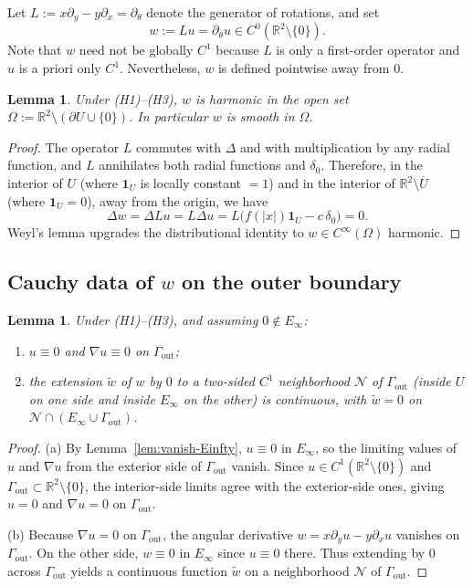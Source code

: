 \documentclass[11pt]{article}
\newtheorem{lemma}[theorem]{Lemma}
\newcommand{\R}{\mathbb R}
\newcommand{\1}{\mathbf 1}
\begin{document}
Let $L:=x\partial_y-y\partial_x=\partial_\theta$ denote the generator of rotations, and set
\[
w:=Lu=\partial_\theta u\in C^0(\R^2\setminus\{0\}).
\]
Note that $w$ need not be globally $C^1$ because $L$ is only a first-order operator and $u$
is a priori only $C^1$. Nevertheless, $w$ is defined pointwise away from $0$.

\begin{lemma}\label{lem:w-harmonic}
Under (H1)--(H3), $w$ is harmonic in the open set
$\Omega:=\R^2\setminus(\partial U\cup\{0\})$.
In particular $w$ is smooth in $\Omega$.
\end{lemma}

\begin{proof}
The operator $L$ commutes with $\Delta$ and with multiplication by any radial function, and
$L$ annihilates both radial functions and $\delta_0$. Therefore, in the interior of $U$
(where $\1_U$ is locally constant $=1$) and in the interior of $\R^2\setminus\overline U$
(where $\1_U=0$), away from the origin, we have
\[
\Delta w=\Delta Lu=L\Delta u=L\bigl(f(|x|)\1_U-c\,\delta_0\bigr)=0.
\]
Weyl's lemma upgrades the distributional identity to $w\in C^\infty(\Omega)$ harmonic.
\end{proof}

\subsection{Cauchy data of $w$ on the outer boundary}

\begin{lemma}\label{lem:cauchy-data}
Under (H1)--(H3), and assuming $0\notin E_\infty$:
\begin{enumerate}[label=(\alph*)]
\item $u\equiv 0$ and $\nabla u\equiv 0$ on $\Gamma_{\mathrm{out}}$;
\item the extension $\tilde w$ of $w$ by $0$ to a two-sided $C^1$ neighborhood
$\mathcal N$ of $\Gamma_{\mathrm{out}}$ (inside $U$ on one side and inside $E_\infty$ on the
other) is continuous, with $\tilde w=0$ on $\mathcal N\cap(E_\infty\cup\Gamma_{\mathrm{out}})$.
\end{enumerate}
\end{lemma}

\begin{proof}
(a) By Lemma~\ref{lem:vanish-Einfty}, $u\equiv 0$ in $E_\infty$, so the limiting values of
$u$ and $\nabla u$ from the exterior side of $\Gamma_{\mathrm{out}}$ vanish. Since
$u\in C^1(\R^2\setminus\{0\})$ and $\Gamma_{\mathrm{out}}\subset\R^2\setminus\{0\}$, the
interior-side limits agree with the exterior-side ones, giving
$u=0$ and $\nabla u=0$ on $\Gamma_{\mathrm{out}}$.

(b) Because $\nabla u=0$ on $\Gamma_{\mathrm{out}}$, the angular derivative
$w=x\partial_y u-y\partial_x u$ vanishes on $\Gamma_{\mathrm{out}}$. On the other side,
$w\equiv 0$ in $E_\infty$ since $u\equiv 0$ there. Thus extending by $0$ across
$\Gamma_{\mathrm{out}}$ yields a continuous function $\tilde w$ on a neighborhood
$\mathcal N$ of $\Gamma_{\mathrm{out}}$.
\end{proof}
\end{document}
